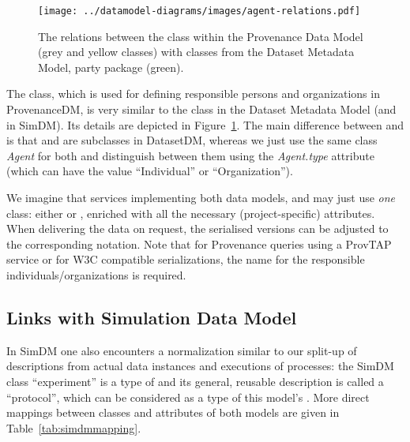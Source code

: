 \begin{figure}[h]
\centering
\texttt{[image: ../datamodel-diagrams/images/agent-relations.pdf]}
\caption{The relations between the  class within the Provenance Data Model 
(grey and yellow classes) with classes from the Dataset Metadata Model, party package (green).}
\label{fig:agent-relations}
\end{figure}

The  class, which is used for defining responsible persons and 
organizations in ProvenanceDM, is very similar to the  class in the Dataset Metadata Model (and in SimDM). Its details are depicted in Figure~\ref{fig:agent-relations}.
The main difference between  and  is that  and  are subclasses in DatasetDM, whereas we just use the same class \emph{Agent} for both and distinguish between them using the \emph{Agent.type} attribute (which can have the value ``Individual'' or ``Organization'').


We imagine that services implementing both data models,  and  may just use \emph{one} class: either  or , enriched with all the necessary (project-specific) attributes. When delivering the data on request, the serialised versions can be adjusted to the corresponding notation.
Note that for Provenance queries using a ProvTAP service or for W3C compatible serializations, the name  for the responsible individuals/organizations is required.



\subsection{Links with Simulation Data Model}
In SimDM one also encounters a normalization similar to our split-up of descriptions from 
actual data instances and executions of processes: the SimDM class ``experiment'' 
is a type of  and its general, reusable description is called a ``protocol'',
which can be considered as a type of this model's . 
More direct mappings between classes and attributes of both models are given in Table~\ref{tab:simdmmapping}.

